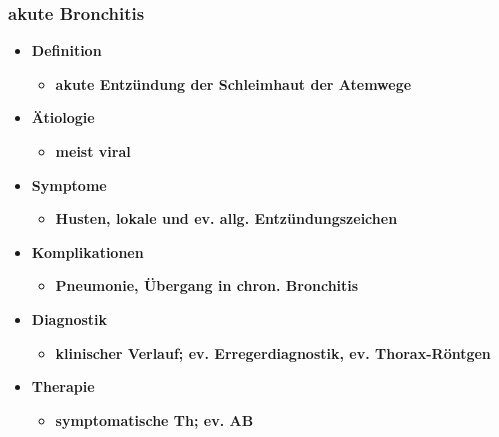 		\subsubsection*{akute Bronchitis}
			\begin{itemize}
				\item \textbf{Definition}
					\begin{itemize}
						\item \textbf{akute Entzündung der Schleimhaut der Atemwege}
					\end{itemize}
				\item \textbf{Ätiologie}
					\begin{itemize}
						\item \textbf{meist viral}
					\end{itemize}
				\item \textbf{Symptome}
					\begin{itemize}
						\item \textbf{Husten, lokale und ev. allg. Entzündungszeichen}
					\end{itemize}
				\item \textbf{Komplikationen}
					\begin{itemize}
						\item \textbf{Pneumonie, Übergang in chron. Bronchitis}
					\end{itemize}
				\item \textbf{Diagnostik}
					\begin{itemize}
						\item \textbf{klinischer Verlauf; ev. Erregerdiagnostik, ev. Thorax-Röntgen}
					\end{itemize}
				\item \textbf{Therapie}
					\begin{itemize}
						\item \textbf{symptomatische Th; ev. AB}
					\end{itemize}
			\end{itemize}
